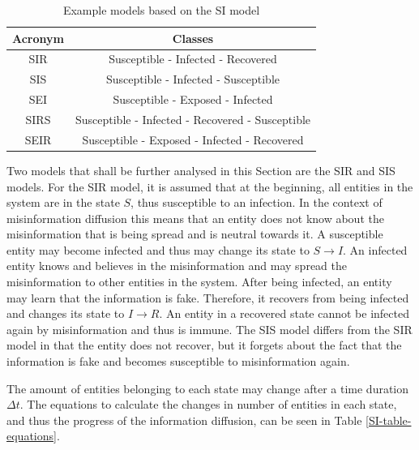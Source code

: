 \begin{table}[ht!]
    \centering
    \begin{tabular}{|c | c |} 
     \hline
     Acronym & Classes  \\ 
     \hline
     SIR & Susceptible - Infected - Recovered  \\ 
     \hline
     SIS & Susceptible - Infected - Susceptible \\
     \hline
     SEI & Susceptible - Exposed - Infected \\
     \hline
     SIRS & Susceptible - Infected - Recovered - Susceptible \\
     \hline
     SEIR & Susceptible - Exposed - Infected - Recovered \\
     \hline
    \end{tabular}
    \caption{Example models based on the SI 
    model  \cite{reviewinformationdiffusion}}
    \label{SI-table}
\end{table}

Two models that shall be further analysed in this Section are the SIR and SIS models. 
For the SIR model, it is assumed that at the beginning, all entities in the 
system are in the state $S$, thus susceptible to an infection. In the context of 
misinformation diffusion this means that an entity does not know about the
misinformation that is being spread and is neutral towards it. A susceptible
entity may become infected and thus may change its state to $S\to I$.
An infected entity knows and believes in the misinformation and may
spread the misinformation to other entities in the system. After being infected,
an entity may learn that the information is fake. Therefore, it recovers 
from being infected and changes its state to $I\to R$. An entity in a 
recovered state cannot be infected again by misinformation and thus is immune.
The SIS model differs from the SIR model in that the entity does not recover,
but it \glqq forgets\grqq{} about the fact that the information is fake 
and becomes susceptible to misinformation again.

The amount of entities belonging to each state may change 
after a time duration $\Delta t$. The equations to calculate the 
changes in number of entities in each state, and thus the progress 
of the information diffusion, can be seen in Table \ref{SI-table-equations}.

